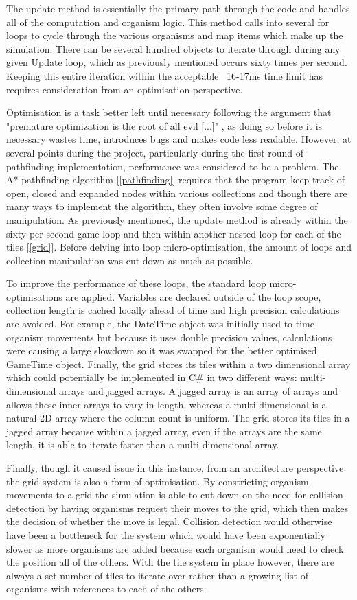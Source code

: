 \documentclass[a4paper, oneside, 11pt]{report}
\begin{document}
The update method is essentially the primary path through the code and handles all of the computation and organism logic. This method calls into several for loops to cycle through the various organisms and map items which make up the simulation. There can be several hundred objects to iterate through during any given Update loop, which as previously mentioned occurs sixty times per second. Keeping this entire iteration within the acceptable ~16-17ms time limit has requires consideration from an optimisation perspective.

Optimisation is a task better left until necessary following the argument that "premature optimization is the root of all evil [...]" \cite{knuth}, as doing so before it is necessary wastes time, introduces bugs and makes code less readable. However, at several points during the project, particularly during the first round of pathfinding implementation, performance was considered to be a problem. The A* pathfinding algorithm [\ref{pathfinding}] requires that the program keep track of open, closed and expanded nodes within various collections and though there are many ways to implement the algorithm, they often involve some degree of manipulation. As previously mentioned, the update method is already within the sixty per second game loop and then within another nested loop for each of the tiles [\ref{grid}]. Before delving into loop micro-optimisation, the amount of loops and collection manipulation was cut down as much as possible.

To improve the performance of these loops, the standard loop micro-optimisations are applied. Variables are declared outside of the loop scope, collection length is cached locally ahead of time and high precision calculations are avoided. For example, the DateTime object was initially used to time organism movements but because it uses double precision values, calculations were causing a large slowdown so it was swapped for the better optimised GameTime object. Finally, the grid stores its tiles within a two dimensional array which could potentially be implemented in C\# in two different ways: multi-dimensional arrays and jagged arrays. A jagged array is an array of arrays and allows these inner arrays to vary in length, whereas a multi-dimensional is a natural 2D array where the column count is uniform. The grid stores its tiles in a jagged array because within a jagged array, even if the arrays are the same length, it is able to iterate faster than a multi-dimensional array.

Finally, though it caused issue in this instance, from an architecture perspective the grid system is also a form of optimisation. By constricting organism movements to a grid the simulation is able to cut down on the need for collision detection by having organisms request their moves to the grid, which then makes the decision of whether the move is legal. Collision detection would otherwise have been a bottleneck for the system which would have been exponentially slower as more organisms are added because each organism would need to check the position all of the others. With the tile system in place however, there are always a set number of tiles to iterate over rather than a growing list of organisms with references to each of the others.
\end{document}
